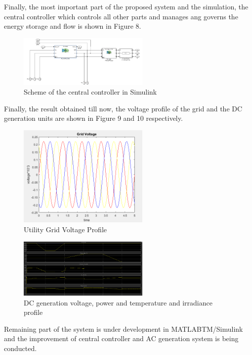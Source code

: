 \documentclass[journal,twoside]{IEEEtran}
\begin{document}
Finally, the most important part of the
proposed system and the simulation, the central
controller which controls all other parts and manages
ang governs the energy storage and flow is shown in
Figure 8.

\begin{figure}[!ht]
\centering
\includegraphics[width=2.5in]{8}
\caption{Scheme of the central controller in Simulink}
\label{f8}
\end{figure}
Finally, the result obtained till now, the
voltage profile of the grid and the DC generation units
are shown in Figure 9 and 10 respectively.

\begin{figure}[!ht]
\centering
\includegraphics[width=2.5in]{9}
\caption{Utility Grid Voltage Profile}
\label{f9}
\end{figure}

\begin{figure}[!ht]
\centering
\includegraphics[width=2.5in]{10}
\caption{DC generation voltage, power and temperature and irradiance profile}
\label{f10}
\end{figure}


Remaining part of the system is under
development in MATLABTM/Simulink and the
improvement of central controller and AC generation
system is being conducted.
\end{document}
